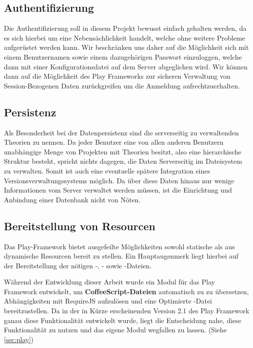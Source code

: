 \subsection{Authentifizierung}

Die Authentifizierung soll in diesem Projekt bewusst einfach gehalten werden, da es sich hierbei um
eine Nebensächlichkeit handelt, welche ohne weitere Probleme aufgerüstet werden kann. Wir
beschränken uns daher auf die Möglichkeit sich mit einem Benutzernamen sowie einem dazugehörigen
Passwort einzuloggen, welche dann mit einer Konfigurationsdatei auf dem Server abgeglichen wird. Wir
können dann auf die Möglichkeit des Play Frameworks zur sicheren Verwaltung von Session-Bezogenen
Daten zurückgreifen um die Anmeldung aufrechtzuerhalten.

\subsection{Persistenz}

Als Besonderheit bei der Datenpersistenz sind die serverseitig zu verwaltenden Theorien zu nennen.
Da jeder Benutzer eine von allen anderen Benutzern unabhängige Menge von Projekten mit Theorien
besitzt, also eine hierarchische Struktur besteht, spricht nichts dagegen, die Daten Serverseitig im
Dateisystem zu verwalten. Somit ist auch eine eventuelle spätere Integration eines
Versionsverwaltungssystems möglich. Da über diese Daten hinaus nur wenige Informationen vom Server
verwaltet werden müssen, ist die Einrichtung und Anbindung einer Datenbank nicht von Nöten.

\subsection{Bereitstellung von Resourcen}

Das Play-Framework bietet ausgefeilte Möglichkeiten sowohl statische als aus dynamische Resourcen
bereit zu stellen. Ein Hauptaugenmerk liegt hierbei auf der Bereitstellung der nötigen -,
- sowie -Dateien.

Während der Entwicklung dieser Arbeit wurde ein Modul für das Play Framework entwickelt, um \textbf
{CoffeeScript-Dateien} automatisch zu  zu übersetzen, Abhängigkeiten mit RequireJS
aufzulösen und eine Optimierte -Datei bereitzustellen. Da in der in Kürze erscheinenden
Version 2.1 des Play Framework ganau diese Funktionalität entwickelt wurde, liegt die Entscheidung
nahe, diese Funktionalität zu nutzen und das eigene Modul wegfallen zu lassen. (Siehe
\ref{sec:play})

